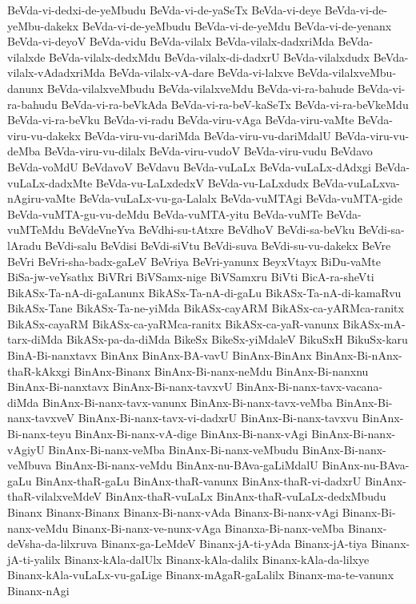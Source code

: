 {BeVda-vi-dedxi-de-yeMbudu
BeVda-vi-de-yaSeTx
BeVda-vi-deye
BeVda-vi-de-yeMbu-dakekx
BeVda-vi-de-yeMbudu
BeVda-vi-de-yeMdu
BeVda-vi-de-yenanx
BeVda-vi-deyoV
BeVda-vidu
BeVda-vilalx
BeVda-vilalx-dadxriMda
BeVda-vilalxde
BeVda-vilalx-dedxMdu
BeVda-vilalx-di-dadxrU
BeVda-vilalxdudx
BeVda-vilalx-vAdadxriMda
BeVda-vilalx-vA-dare
BeVda-vi-lalxve
BeVda-vilalxveMbu-danunx
BeVda-vilalxveMbudu
BeVda-vilalxveMdu
BeVda-vi-ra-bahude
BeVda-vi-ra-bahudu
BeVda-vi-ra-beVkAda
BeVda-vi-ra-beV-kaSeTx
BeVda-vi-ra-beVkeMdu
BeVda-vi-ra-beVku
BeVda-vi-radu
BeVda-viru-vAga
BeVda-viru-vaMte
BeVda-viru-vu-dakekx
BeVda-viru-vu-dariMda
BeVda-viru-vu-dariMdalU
BeVda-viru-vu-deMba
BeVda-viru-vu-dilalx
BeVda-viru-vudoV
BeVda-viru-vudu
BeVdavo
BeVda-voMdU
BeVdavoV
BeVdavu
BeVda-vuLaLx
BeVda-vuLaLx-dAdxgi
BeVda-vuLaLx-dadxMte
BeVda-vu-LaLxdedxV
BeVda-vu-LaLxdudx
BeVda-vuLaLxva-nAgiru-vaMte
BeVda-vuLaLx-vu-ga-Lalalx
BeVda-vuMTAgi
BeVda-vuMTA-gide
BeVda-vuMTA-gu-vu-deMdu
BeVda-vuMTA-yitu
BeVda-vuMTe
BeVda-vuMTeMdu
BeVdeVneYva
BeVdhi-su-tAtxre
BeVdhoV
BeVdi-sa-beVku
BeVdi-sa-lAradu
BeVdi-salu
BeVdisi
BeVdi-siVtu
BeVdi-suva
BeVdi-su-vu-dakekx
BeVre
BeVri
BeVri-sha-badx-gaLeV
BeVriya
BeVri-yanunx
BeyxVtayx
BiDu-vaMte
BiSa-jw-veYsathx
BiVRri
BiVSamx-nige
BiVSamxru
BiVti
BicA-ra-sheVti
BikASx-Ta-nA-di-gaLanunx
BikASx-Ta-nA-di-gaLu
BikASx-Ta-nA-di-kamaRvu
BikASx-Tane
BikASx-Ta-ne-yiMda
BikASx-cayARM
BikASx-ca-yARMca-ranitx
BikASx-cayaRM
BikASx-ca-yaRMca-ranitx
BikASx-ca-yaR-vanunx
BikASx-mA-tarx-diMda
BikASx-pa-da-diMda
BikeSx
BikeSx-yiMdaleV
BikuSxH
BikuSx-karu
BinA-Bi-nanxtavx
BinAnx
BinAnx-BA-vavU
BinAnx-BinAnx
BinAnx-Bi-nAnx-thaR-kAkxgi
BinAnx-Binanx
BinAnx-Bi-nanx-neMdu
BinAnx-Bi-nanxnu
BinAnx-Bi-nanxtavx
BinAnx-Bi-nanx-tavxvU
BinAnx-Bi-nanx-tavx-vacana-diMda
BinAnx-Bi-nanx-tavx-vanunx
BinAnx-Bi-nanx-tavx-veMba
BinAnx-Bi-nanx-tavxveV
BinAnx-Bi-nanx-tavx-vi-dadxrU
BinAnx-Bi-nanx-tavxvu
BinAnx-Bi-nanx-teyu
BinAnx-Bi-nanx-vA-dige
BinAnx-Bi-nanx-vAgi
BinAnx-Bi-nanx-vAgiyU
BinAnx-Bi-nanx-veMba
BinAnx-Bi-nanx-veMbudu
BinAnx-Bi-nanx-veMbuva
BinAnx-Bi-nanx-veMdu
BinAnx-nu-BAva-gaLiMdalU
BinAnx-nu-BAva-gaLu
BinAnx-thaR-gaLu
BinAnx-thaR-vanunx
BinAnx-thaR-vi-dadxrU
BinAnx-thaR-vilalxveMdeV
BinAnx-thaR-vuLaLx
BinAnx-thaR-vuLaLx-dedxMbudu
Binanx
Binanx-Binanx
Binanx-Bi-nanx-vAda
Binanx-Bi-nanx-vAgi
Binanx-Bi-nanx-veMdu
Binanx-Bi-nanx-ve-nunx-vAga
Binanxa-Bi-nanx-veMba
Binanx-deVsha-da-lilxruva
Binanx-ga-LeMdeV
Binanx-jA-ti-yAda
Binanx-jA-tiya
Binanx-jA-ti-yalilx
Binanx-kAla-dalUlx
Binanx-kAla-dalilx
Binanx-kAla-da-lilxye
Binanx-kAla-vuLaLx-vu-gaLige
Binanx-mAgaR-gaLalilx
Binanx-ma-te-vanunx
Binanx-nAgi
}
